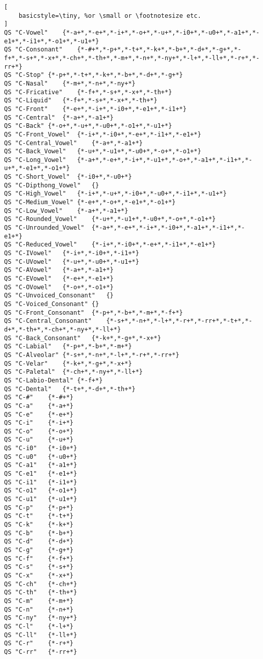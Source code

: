 \begin{lstlisting}[
    basicstyle=\tiny, %or \small or \footnotesize etc.
]
QS "C-Vowel"	{*-a+*,*-e+*,*-i+*,*-o+*,*-u+*,*-i0+*,*-u0+*,*-a1+*,*-e1+*,*-i1+*,*-o1+*,*-u1+*}
QS "C-Consonant"	{*-#+*,*-p+*,*-t+*,*-k+*,*-b+*,*-d+*,*-g+*,*-f+*,*-s+*,*-x+*,*-ch+*,*-th+*,*-m+*,*-n+*,*-ny+*,*-l+*,*-ll+*,*-r+*,*-rr+*}
QS "C-Stop"	{*-p+*,*-t+*,*-k+*,*-b+*,*-d+*,*-g+*}
QS "C-Nasal"	{*-m+*,*-n+*,*-ny+*}
QS "C-Fricative"	{*-f+*,*-s+*,*-x+*,*-th+*}
QS "C-Liquid"	{*-f+*,*-s+*,*-x+*,*-th+*}
QS "C-Front"	{*-e+*,*-i+*,*-i0+*,*-e1+*,*-i1+*}
QS "C-Central"	{*-a+*,*-a1+*}
QS "C-Back"	{*-o+*,*-u+*,*-u0+*,*-o1+*,*-u1+*}
QS "C-Front_Vowel"	{*-i+*,*-i0+*,*-e+*,*-i1+*,*-e1+*}
QS "C-Central_Vowel"	{*-a+*,*-a1+*}
QS "C-Back_Vowel"	{*-u+*,*-u1+*,*-u0+*,*-o+*,*-o1+*}
QS "C-Long_Vowel"	{*-a+*,*-e+*,*-i+*,*-u1+*,*-o+*,*-a1+*,*-i1+*,*-u+*,*-e1+*,*-o1+*}
QS "C-Short_Vowel"	{*-i0+*,*-u0+*}
QS "C-Dipthong_Vowel"	{}
QS "C-High_Vowel"	{*-i+*,*-u+*,*-i0+*,*-u0+*,*-i1+*,*-u1+*}
QS "C-Medium_Vowel"	{*-e+*,*-o+*,*-e1+*,*-o1+*}
QS "C-Low_Vowel"	{*-a+*,*-a1+*}
QS "C-Rounded_Vowel"	{*-u+*,*-u1+*,*-u0+*,*-o+*,*-o1+*}
QS "C-Unrounded_Vowel"	{*-a+*,*-e+*,*-i+*,*-i0+*,*-a1+*,*-i1+*,*-e1+*}
QS "C-Reduced_Vowel"	{*-i+*,*-i0+*,*-e+*,*-i1+*,*-e1+*}
QS "C-IVowel"	{*-i+*,*-i0+*,*-i1+*}
QS "C-UVowel"	{*-u+*,*-u0+*,*-u1+*}
QS "C-AVowel"	{*-a+*,*-a1+*}
QS "C-EVowel"	{*-e+*,*-e1+*}
QS "C-OVowel"	{*-o+*,*-o1+*}
QS "C-Unvoiced_Consonant"	{}
QS "C-Voiced_Consonant"	{}
QS "C-Front_Consonant"	{*-p+*,*-b+*,*-m+*,*-f+*}
QS "C-Central_Consonant"	{*-s+*,*-n+*,*-l+*,*-r+*,*-rr+*,*-t+*,*-d+*,*-th+*,*-ch+*,*-ny+*,*-ll+*}
QS "C-Back_Consonant"	{*-k+*,*-g+*,*-x+*}
QS "C-Labial"	{*-p+*,*-b+*,*-m+*}
QS "C-Alveolar"	{*-s+*,*-n+*,*-l+*,*-r+*,*-rr+*}
QS "C-Velar"	{*-k+*,*-g+*,*-x+*}
QS "C-Paletal"	{*-ch+*,*-ny+*,*-ll+*}
QS "C-Labio-Dental"	{*-f+*}
QS "C-Dental"	{*-t+*,*-d+*,*-th+*}
QS "C-#"	{*-#+*}
QS "C-a"	{*-a+*}
QS "C-e"	{*-e+*}
QS "C-i"	{*-i+*}
QS "C-o"	{*-o+*}
QS "C-u"	{*-u+*}
QS "C-i0"	{*-i0+*}
QS "C-u0"	{*-u0+*}
QS "C-a1"	{*-a1+*}
QS "C-e1"	{*-e1+*}
QS "C-i1"	{*-i1+*}
QS "C-o1"	{*-o1+*}
QS "C-u1"	{*-u1+*}
QS "C-p"	{*-p+*}
QS "C-t"	{*-t+*}
QS "C-k"	{*-k+*}
QS "C-b"	{*-b+*}
QS "C-d"	{*-d+*}
QS "C-g"	{*-g+*}
QS "C-f"	{*-f+*}
QS "C-s"	{*-s+*}
QS "C-x"	{*-x+*}
QS "C-ch"	{*-ch+*}
QS "C-th"	{*-th+*}
QS "C-m"	{*-m+*}
QS "C-n"	{*-n+*}
QS "C-ny"	{*-ny+*}
QS "C-l"	{*-l+*}
QS "C-ll"	{*-ll+*}
QS "C-r"	{*-r+*}
QS "C-rr"	{*-rr+*}


\end{lstlisting}
